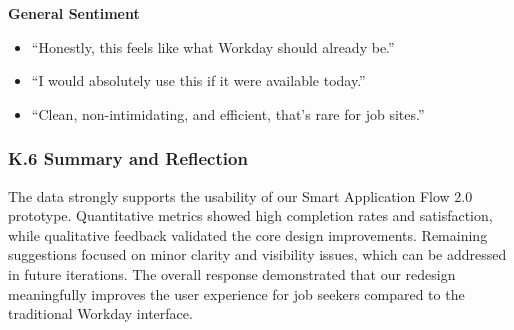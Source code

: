\documentclass[
	letterpaper, %
]{jdf}
\begin{document}
\begin{sloppypar}
\textbf{General Sentiment}
\begin{itemize}
    \item “Honestly, this feels like what Workday should already be.”
    \item “I would absolutely use this if it were available today.”
    \item “Clean, non-intimidating, and efficient, that’s rare for job sites.”
\end{itemize}

\subsubsection{K.6 Summary and Reflection}

The data strongly supports the usability of our Smart Application Flow 2.0 prototype. Quantitative metrics showed high completion rates and satisfaction, while qualitative feedback validated the core design improvements. Remaining suggestions focused on minor clarity and visibility issues, which can be addressed in future iterations. The overall response demonstrated that our redesign meaningfully improves the user experience for job seekers compared to the traditional Workday interface.


\end{sloppypar}
\end{document}
